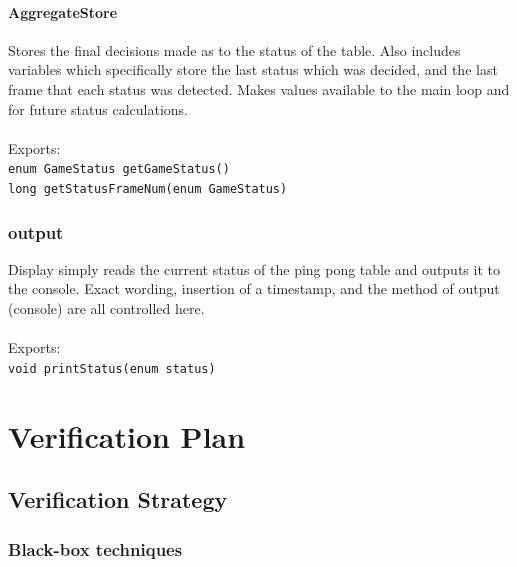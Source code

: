 \documentclass[11pt]{report}
\begin{document}
\subsubsection{AggregateStore}

Stores the final decisions made as to the status of the table.  Also includes variables which specifically store the last status which was decided, and the last frame that each status was detected.  Makes values available to the main loop and for future status calculations.\\
\\
Exports:\\
\texttt{enum GameStatus getGameStatus()}\\
\texttt{long getStatusFrameNum(enum GameStatus)}

\subsection{output}

Display simply reads the current status of the ping pong table and outputs it to the console.  Exact wording, insertion of a timestamp, and the method of output (console) are all controlled here.\\
\\
Exports: \\
\texttt{void printStatus(enum status)}

\chapter{Verification Plan}
\section{Verification Strategy}
\subsection{Black-box techniques}
\end{document}
